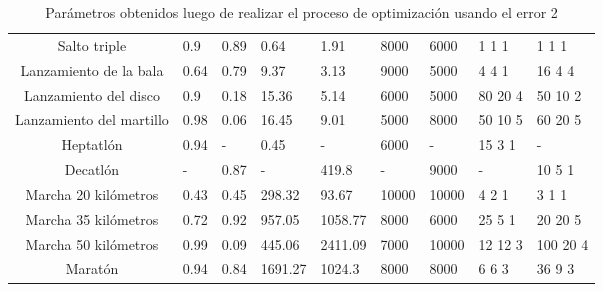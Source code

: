 \begin{anexos}
\begin{table}[H]
{\begin{tabular}{|c|P{1.3cm}|P{1.2cm}|P{1.3cm}|P{1.2cm}|P{1.4cm}|P{1.2cm}|P{2cm}|P{1.5cm}|}
            Salto triple & 0.9 & 0.89 & 0.64 & 1.91 & 8000 & 6000 & 1 1 1 & 1 1 1 \\
            Lanzamiento de la bala & 0.64 & 0.79 & 9.37 & 3.13 & 9000 & 5000 & 4 4 1 & 16 4 4 \\
            Lanzamiento del disco & 0.9 & 0.18 & 15.36 & 5.14 & 6000 & 5000 & 80 20 4 & 50 10 2 \\
            Lanzamiento del martillo & 0.98 & 0.06 & 16.45 & 9.01 & 5000 & 8000 & 50 10 5 & 60 20 5 \\
            Heptatlón & 0.94 & - & 0.45 & - & 6000 & - & 15 3 1 & - \\
            Decatlón & - & 0.87 & - & 419.8 & - & 9000 & - & 10 5 1 \\
            Marcha 20 kilómetros & 0.43 & 0.45 & 298.32 & 93.67 & 10000 & 10000 & 4 2 1 & 3 1 1 \\
            Marcha 35 kilómetros & 0.72 & 0.92 & 957.05 & 1058.77 & 8000 & 6000 & 25 5 1 & 20 20 5 \\
            Marcha 50 kilómetros & 0.99 & 0.09 & 445.06 & 2411.09 & 7000 & 10000 & 12 12 3 & 100 20 4 \\
            Maratón & 0.94 & 0.84 & 1691.27 & 1024.3 & 8000 & 8000 & 6 6 3 & 36 9 3 \\
            \hline
        \end{tabular}
        \caption{Parámetros obtenidos luego de realizar el proceso de optimización usando el error 2}
        \label{tab:paramserror2}
    }
\end{table}

\end{anexos}